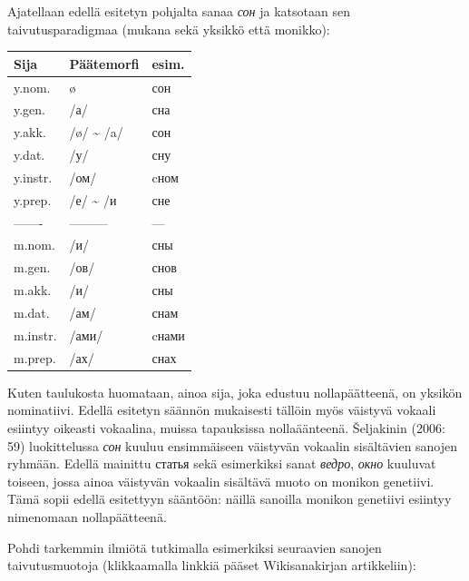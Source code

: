 \documentclass[]{scrartcl}
\begin{document}
Ajatellaan edellä esitetyn pohjalta sanaa \emph{сон} ja katsotaan sen
taivutusparadigmaa (mukana sekä yksikkö että monikko):

\begin{longtable}[c]{@{}lll@{}}
\toprule
Sija & Päätemorfi & esim.\tabularnewline
\midrule
\endhead
y.nom. & ø & сон\tabularnewline
y.gen. & /а/ & сна\tabularnewline
y.akk. & /ø/ \textasciitilde{} /a/ & сон\tabularnewline
y.dat. & /у/ & сну\tabularnewline
y.instr. & /ом/ & cном\tabularnewline
y.prep. & /е/ \textasciitilde{} /и & сне\tabularnewline
------- & --------- & ---\tabularnewline
m.nom. & /и/ & сны\tabularnewline
m.gen. & /ов/ & снов\tabularnewline
m.akk. & /и/ & сны\tabularnewline
m.dat. & /ам/ & снам\tabularnewline
m.instr. & /ами/ & cнами\tabularnewline
m.prep. & /ах/ & снах\tabularnewline
\bottomrule
\end{longtable}

Kuten taulukosta huomataan, ainoa sija, joka edustuu nollapäätteenä, on
yksikön nominatiivi. Edellä esitetyn säännön mukaisesti tällöin myös
väistyvä vokaali esiintyy oikeasti vokaalina, muissa tapauksissa
nollaäänteenä. Šeljakinin (2006: 59) luokittelussa \emph{сон} kuuluu
ensimmäiseen väistyvän vokaalin sisältävien sanojen ryhmään. Edellä
mainittu статья sekä esimerkiksi sanat \emph{ведро}, \emph{окно}
kuuluvat toiseen, jossa ainoa väistyvän vokaalin sisältävä muoto on
monikon genetiivi. Tämä sopii edellä esitettyyn sääntöön: näillä
sanoilla monikon genetiivi esiintyy nimenomaan nollapäätteenä.

Pohdi tarkemmin ilmiötä tutkimalla esimerkiksi seuraavien sanojen
taivutusmuotoja (klikkaamalla linkkiä pääset Wikisanakirjan
artikkeliin):
\end{document}
